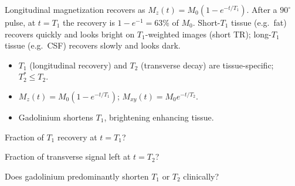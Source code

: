 \begin{workedexample}
Longitudinal magnetization recovers as
$M_z(t) = M_0(1 - e^{-t/T_1})$. After a $90^{\circ}$ pulse, at $t = T_1$ the
recovery is $1 - e^{-1} = 63\%$ of $M_0$. Short-$T_1$ tissue (e.g.\ fat) recovers
quickly and looks bright on $T_1$-weighted images (short TR); long-$T_1$ tissue
(e.g.\ CSF) recovers slowly and looks dark.
\end{workedexample}

\begin{keytakeaways}
\begin{itemize}[leftmargin=1.4em,itemsep=2pt]
\item $T_1$ (longitudinal recovery) and $T_2$ (transverse decay) are tissue-specific; $T_2^{*} \le T_2$.
\item $M_z(t) = M_0(1 - e^{-t/T_1})$; $M_{xy}(t) = M_0 e^{-t/T_2}$.
\item Gadolinium shortens $T_1$, brightening enhancing tissue.
\end{itemize}
\end{keytakeaways}

\begin{exercises}
\item Fraction of $T_1$ recovery at $t = T_1$?
\item Fraction of transverse signal left at $t = T_2$?
\item Does gadolinium predominantly shorten $T_1$ or $T_2$ clinically?
\end{exercises}

